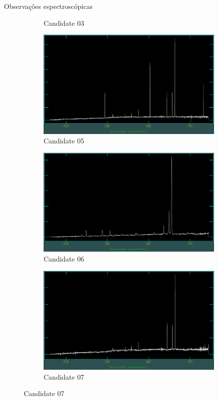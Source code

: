 \begin{frame}[c]{Observações espectroscópicas}
\begin{figure}
\begin{subfigure}[b]{0.31\textwidth}
        \caption{Candidate 03}
    \end{subfigure}
    \begin{subfigure}[b]{0.31\textwidth}
        \includegraphics[width=\textwidth]{images/espectros/Candidate4.png}
        \caption{Candidate 05}
    \end{subfigure}
    \begin{subfigure}[b]{0.31\textwidth}
        \includegraphics[width=\textwidth]{images/espectros/Candidate5.png}
        \caption{Candidate 06}
    \end{subfigure}
    \begin{subfigure}[b]{0.31\textwidth}
        \includegraphics[width=\textwidth]{images/espectros/Candidate6.png}
        \caption{Candidate 07}
    \end{subfigure}
\end{figure}
\end{frame}

